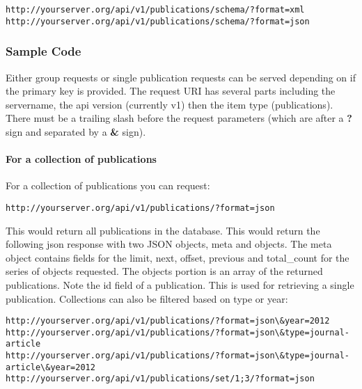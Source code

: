 \documentclass[letterpaper,10pt,english]{sphinxmanual}
\begin{document}
\begin{Verbatim}[commandchars=\\\{\}]
http://yourserver.org/api/v1/publications/schema/?format=xml
http://yourserver.org/api/v1/publications/schema/?format=json
\end{Verbatim}


\subsubsection{Sample Code}
\label{papers:sample-code}
Either group requests or single publication requests can be served depending on if the primary key is provided.  The request URI has several parts including the servername, the api version (currently v1) then the item type (publications).  There must be a trailing slash before the request parameters (which are after a \textbf{?} sign and separated by a \textbf{\&} sign).


\paragraph{For a collection of publications}
\label{papers:for-a-collection-of-publications}
For a collection of publications you can request:

\begin{Verbatim}[commandchars=\\\{\}]
http://yourserver.org/api/v1/publications/?format=json
\end{Verbatim}

This would return all publications in the database.  This would return the following json response with two JSON objects, meta and objects.
The meta object contains fields for the limit, next, offset, previous and total\_count for the series of objects requested.  The objects portion is an array of the returned publications.  Note the id field of a publication.  This is used for retrieving a single publication.  Collections can also be filtered based on type or year:

\begin{Verbatim}[commandchars=\\\{\}]
http://yourserver.org/api/v1/publications/?format=json\&year=2012     
http://yourserver.org/api/v1/publications/?format=json\&type=journal-article 
http://yourserver.org/api/v1/publications/?format=json\&type=journal-article\&year=2012
http://yourserver.org/api/v1/publications/set/1;3/?format=json
\end{Verbatim}
\end{document}
